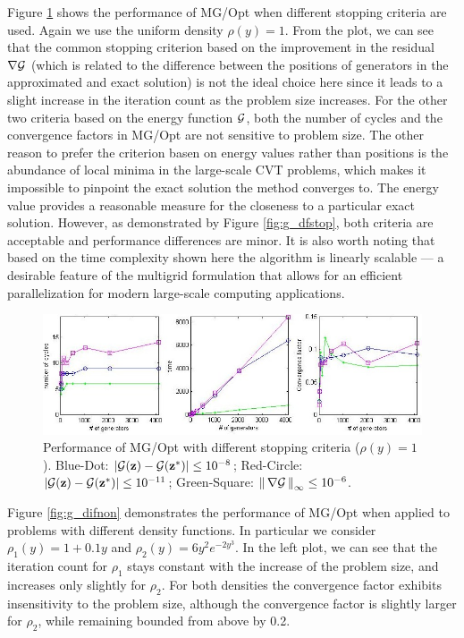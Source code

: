 \documentclass{siamltex}
\begin{document}
Figure \ref{fig:g_difstop} shows the performance of MG/Opt when different stopping criteria are used.  Again we use the uniform density $\rho(y) = 1$.  From the plot, we can see that the common stopping criterion based on the improvement in the residual  $\nabla \cg$ (which is related to the difference between the positions of generators in the approximated and exact solution) is not the ideal choice here since it leads to a slight increase in the iteration count as the problem size increases.  For the other two criteria based on the energy function $\cg$, both the number of cycles and the convergence factors in MG/Opt are not sensitive to problem size. The other reason to prefer the criterion basen on energy values rather than positions is the abundance of local minima in the large-scale CVT problems, which makes it impossible to pinpoint the exact solution the method converges to. The energy value provides a reasonable measure for the closeness to a particular exact solution. However, as demonstrated by Figure \ref{fig:g_dfstop}, both criteria are acceptable and performance differences are minor.
It is also worth noting that based on the time complexity shown here the algorithm is linearly scalable --- a desirable feature %
of the multigrid formulation that allows for an efficient parallelization for modern large-scale computing applications.

\begin{figure}[h]
\centering
  \includegraphics[width=1.0\textwidth]{uni_diffstop}
  \caption{Performance of MG/Opt with different stopping criteria ($\rho(y) = 1$).
    Blue-Dot: $|\cg(\bz)-\cg(\bz^{*})| \le 10^{-8}$; Red-Circle: $|\cg(\bz)-\cg(\bz^{*})| \le 10^{-11}$;
    Green-Square: $\norm{\nabla \cg}_\infty \le 10^{-6}$.}
\label{fig:g_difstop}
\end{figure}




Figure \ref{fig:g_difnon} demonstrates the performance of MG/Opt when applied to problems with different density functions.  In particular we consider $\rho_1(y)=1+0.1y$ and $\rho_2(y)=6y^{2}e^{-2y^{3}}$.  In the left plot, we can see that the iteration count for $\rho_1$ stays constant with the increase of the problem size, and increases only slightly for $\rho_2$.  For both densities the convergence factor exhibits insensitivity to the problem size, although the convergence factor is slightly larger for $\rho_2$, while remaining bounded from above by 0.2.
\end{document}
